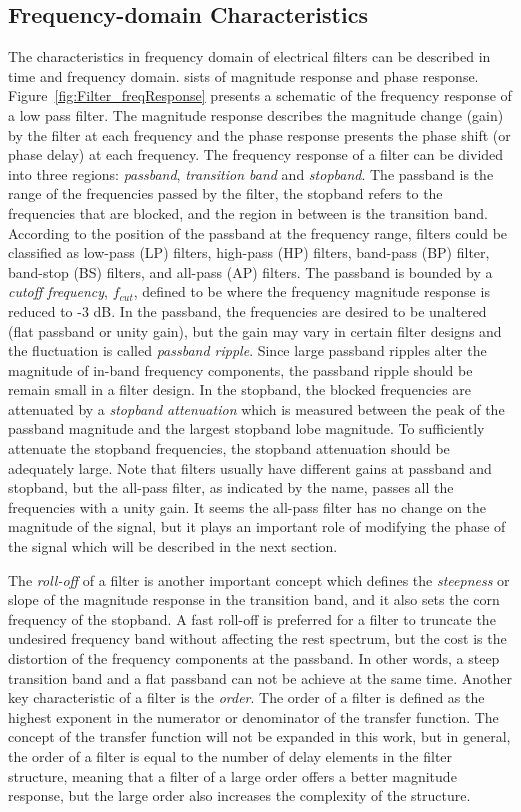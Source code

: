 \subsection{Frequency-domain Characteristics}
The characteristics in frequency domain of electrical filters can be described in time and frequency domain. sists of magnitude response and phase response. Figure~\ref{fig:Filter_freqResponse} presents a schematic of the frequency response of a low pass filter. The magnitude response describes the magnitude change (gain) by the filter at each frequency and the phase response presents the phase shift (or phase delay) at each frequency. The frequency response of a filter can be divided into three regions: \emph{passband}, \emph{transition band} and \emph{stopband}. The passband is the range of the frequencies passed by the filter, the stopband refers to the frequencies that are blocked, and the region in between is the transition band. According to the position of the passband at the frequency range, filters could be classified as low-pass (LP) filters, high-pass (HP) filters, band-pass (BP) filter, band-stop (BS) filters, and all-pass (AP) filters. The passband is bounded by a \emph{cutoff frequency}, $f_{cut}$, defined to be where the frequency magnitude response is reduced to -3 dB. In the passband, the frequencies are desired to be unaltered (flat passband or unity gain), but the gain may vary in certain filter designs and the fluctuation is called \emph{passband ripple}. Since large passband ripples alter the magnitude of in-band frequency components, the passband ripple should be remain small in a filter design. In the stopband, the blocked frequencies are attenuated by a \emph{stopband attenuation} which is measured between the peak of the passband magnitude and the largest stopband lobe magnitude. To sufficiently attenuate the stopband frequencies, the stopband attenuation should be adequately large. Note that filters usually have different gains at passband and stopband, but the all-pass filter, as indicated by the name, passes all the frequencies with a unity gain. It seems the all-pass filter has no change on the magnitude of the signal, but it plays an important role of modifying the phase of the signal which will be described in the next section. \par
The \emph{roll-off} of a filter is another important concept which defines the \emph{steepness} or slope of the magnitude response in the transition band, and it also sets the corn frequency of the stopband. A fast roll-off is preferred for a filter to truncate the undesired frequency band without affecting the rest spectrum, but the cost is the distortion of the frequency components at the passband. In other words, a steep transition band and a flat passband can not be achieve at the same time. Another key characteristic of a filter is the \emph{order}. The order of a filter is defined as the highest exponent in the numerator or denominator of the transfer function. The concept of the transfer function will not be expanded in this work, but in general, the order of a filter is equal to the number of delay elements in the filter structure, meaning that a filter of a large order offers a better magnitude response, but the large order also increases the complexity of the structure.
